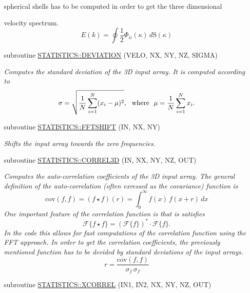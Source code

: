 \begin{DoxyCompactItemize}
\begin{DoxyCompactList}
 spherical shells has to be computed in order to get the three dimensional\par
 velocity spectrum. \[ E(k)=\oint\frac{1}{2}\Phi_{ii}(\kappa)\,d\mathrm{S}(\kappa) \] \end{DoxyCompactList}\item 
subroutine \hyperlink{namespaceSTATISTICS_a96f2830bd74ef7e612bb9b567a488fcb}{STATISTICS::DEVIATION} (VELO, NX, NY, NZ, SIGMA)
\begin{DoxyCompactList}\small\item\em Computes the standard deviation of the 3D input array. It is computed according to \[\sigma = \sqrt{\frac{1}{N} \sum_{i=1}^N (x_i - \mu)^2}, {\rm \ \ where\ \ } \mu = \frac{1}{N} \sum_{i=1}^N x_i. \] \end{DoxyCompactList}\item 
subroutine \hyperlink{namespaceSTATISTICS_ac51d5b789da17893b95107ddcb97813f}{STATISTICS::FFTSHIFT} (IN, NX, NY)
\begin{DoxyCompactList}\small\item\em Shifts the input array towards the zero frequencies. \end{DoxyCompactList}\item 
subroutine \hyperlink{namespaceSTATISTICS_a6631e38a843e8bfa986d426daebd6f4c}{STATISTICS::CORREL3D} (IN, NX, NY, NZ, OUT)
\begin{DoxyCompactList}\small\item\em Computes the auto-\/correlation coefficients of the 3D input array. The general definition of the auto-\/correlation (often exressed as the covariance) function is \[\mathrm{cov}(f,f)=\left(f\star f\right)(r)=\int_0^{\infty}f(x)\,f(x+r)\,dx \] One important feature of the correlation function is that is satisfies \[\mathcal{F}\{f\star f\}=(\mathcal{F}\{f\})^*\cdot\mathcal{F}\{f\}. \] In the code this allows for fast computations of the correlation function using the FFT approach. In order to get the correlation coefficients, the previously mentioned function has to be devided by standard deviations of the input arrays. \[r=\frac{\mathrm{cov}(f,f)}{\sigma_f\,\sigma_f} \] \end{DoxyCompactList}\item 
subroutine \hyperlink{namespaceSTATISTICS_a2529efc59bb06c5f2280df7277bf5c7d}{STATISTICS::XCORREL} (IN1, IN2, NX, NY, NZ, OUT)

\end{DoxyCompactItemize}
